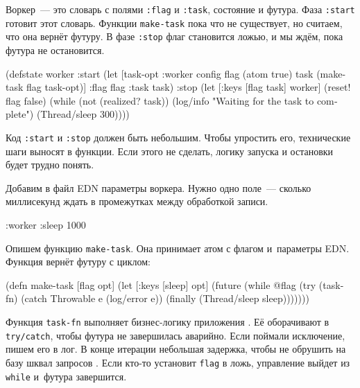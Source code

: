 Воркер~--- это словарь с полями \verb|:flag| и \verb|:task|, состояние и
футура. Фаза \verb|:start| готовит этот словарь. Функции \verb|make-task|
пока что не существует, но считаем, что она вернёт футуру. В фазе \verb|:stop|
флаг становится ложью, и мы ждём, пока футура не остановится.


\begin{english}
  \begin{clojure}
(defstate worker
  :start
  (let [{task-opt :worker} config
        flag (atom true)
        task (make-task flag task-opt)]
    {:flag flag :task task})
  :stop
  (let [{:keys [flag task]} worker]
    (reset! flag false)
    (while (not (realized? task))
      (log/info "Waiting for the task to complete")
      (Thread/sleep 300))))
  \end{clojure}
\end{english}

Код \verb|:start| и \verb|:stop| должен быть небольшим. Чтобы упростить его,
технические шаги выносят в функции. Если этого не сделать, логику запуска и
остановки будет трудно понять.

Добавим в файл EDN параметры воркера. Нужно одно поле~--- сколько миллисекунд
ждать в промежутках между обработкой записи.

\begin{english}
  \begin{clojure}
{:worker {:sleep 1000}}
  \end{clojure}
\end{english}


Опишем функцию \verb|make-task|. Она принимает атом с флагом и~параметры
EDN. Функция вернёт футуру с циклом:

\begin{english}
  \begin{clojure/lines}
(defn make-task
  [flag opt]
  (let [{:keys [sleep]} opt]
    (future
      (while @flag
        (try
          (task-fn)
          (catch Throwable e
            (log/error e))
          (finally
            (Thread/sleep sleep)))))))
  \end{clojure/lines}
\end{english}

Функция \verb|task-fn| выполняет бизнес-логику приложения . Её
оборачивают в \verb|try/catch|, чтобы футура не завершилась аварийно. Если
поймали исключение, пишем его в лог. В конце итерации небольшая задержка, чтобы
не обрушить на базу шквал запросов . Если кто-то установит
\verb|flag| в ложь, управление выйдет из \verb|while| и~футура завершится.

